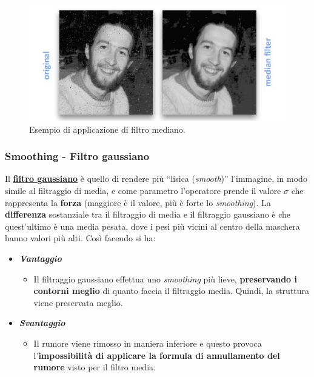 \documentclass[a4paper]{article}
\newcommand{\dquotes}[1]{``#1''}
\begin{document}
	\begin{figure}[!htp]
		\centering
		\includegraphics[width=\textwidth]{img/filtro_mediano.png}
		\caption{Esempio di applicazione di filtro mediano.}
	\end{figure}

	\newpage
	
	\subsubsection{Smoothing - Filtro gaussiano}
	
	Il \textcolor{Red3}{\textbf{\underline{filtro gaussiano}}} è quello di rendere più \dquotes{lisica (\emph{smooth})} l'immagine, in modo simile al filtraggio di media, e come parametro l'operatore prende il valore $\sigma$ che rappresenta la \textbf{forza} (maggiore è il valore, più è forte lo \emph{smoothing}). La \textbf{differenza} sostanziale tra il filtraggio di media e il filtraggio gaussiano è che quest'ultimo è una media pesata, dove i pesi più vicini al centro della maschera hanno valori più alti. Così facendo si ha:
	
	\begin{itemize}
		\item \textcolor{Green4}{\textbf{\emph{Vantaggio}}}
		\begin{itemize}
			\item Il filtraggio gaussiano effettua uno \emph{smoothing} più lieve, \textbf{preservando i contorni meglio} di quanto faccia il filtraggio media. Quindi, la struttura viene preservata meglio.
		\end{itemize}
		
		\item \textcolor{Red3}{\textbf{\emph{Svantaggio}}}
		\begin{itemize}
			\item Il rumore viene rimosso in maniera inferiore e questo provoca l'\textbf{impossibilità di applicare la formula di annullamento del rumore} visto per il filtro media.
		\end{itemize}
	\end{itemize}
\end{document}
